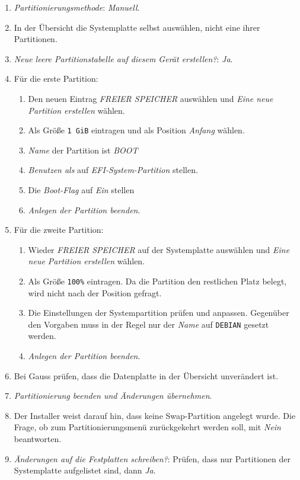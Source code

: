 
\begin{enumerate}
	\item \textit{Partitionierungsmethode}: \textit{Manuell}.
	\item In der Übersicht die Systemplatte selbst auswählen, nicht eine ihrer Partitionen.
	\item \textit{Neue leere Partitionstabelle auf diesem Gerät erstellen?}: \textit{Ja}.
	\item Für die erste Partition:
	      \begin{enumerate}
		      \item Den neuen Eintrag \textit{FREIER SPEICHER} auswählen und \textit{Eine neue Partition erstellen} wählen.
		      \item Als Größe \texttt{1 GiB} eintragen und als Position \textit{Anfang} wählen.
		      \item \textit{Name} der Partition ist \textit{BOOT}
		      \item \textit{Benutzen als} auf \textit{EFI-System-Partition} stellen.
		      \item Die \textit{Boot-Flag} auf \textit{Ein} stellen
		      \item \textit{Anlegen der Partition beenden}.
	      \end{enumerate}
	\item Für die zweite Partition:
	      \begin{enumerate}
		      \item Wieder \textit{FREIER SPEICHER} auf der Systemplatte auswählen und \textit{Eine neue Partition erstellen} wählen.
		      \item Als Größe \texttt{100\%} eintragen. Da die Partition den restlichen Platz belegt, wird nicht nach der Position gefragt.
		      \item Die Einstellungen der Systempartition prüfen und anpassen. Gegenüber den Vorgaben muss in der Regel nur der \textit{Name} auf \texttt{DEBIAN} gesetzt werden.
		      \item \textit{Anlegen der Partition beenden}.
	      \end{enumerate}
	\item Bei Gauss prüfen, dass die Datenplatte in der Übersicht unverändert ist.
	\item \textit{Partitionierung beenden und Änderungen übernehmen}.
	\item Der Installer weist darauf hin, dass keine Swap-Partition angelegt wurde. Die Frage, ob zum Partitionierungsmenü zurückgekehrt werden soll, mit \textit{Nein} beantworten.
	\item \textit{Änderungen auf die Festplatten schreiben?}: Prüfen, dass nur Partitionen der Systemplatte aufgelistet sind, dann \textit{Ja}.
\end{enumerate}

